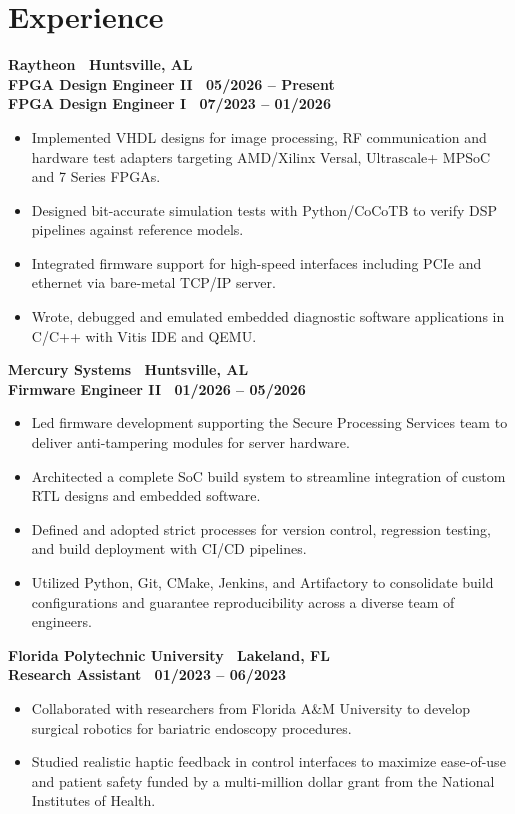 \section{Experience}

\textbf{Raytheon \textbar\ Huntsville, AL} \\
{\small\textbf{FPGA Design Engineer II \textbar\ 05/2026 -- Present}} \\
{\small\textbf{FPGA Design Engineer I \textbar\ 07/2023 -- 01/2026}}

\begin{itemize}
  \item Implemented VHDL designs for image processing, RF communication and hardware test adapters targeting AMD/Xilinx Versal, Ultrascale+ MPSoC and 7 Series FPGAs.
  \item Designed bit-accurate simulation tests with Python/CoCoTB to verify DSP pipelines against reference models.
  \item Integrated firmware support for high-speed interfaces including PCIe and ethernet via bare-metal TCP/IP server.
  \item Wrote, debugged and emulated embedded diagnostic software applications in C/C++ with Vitis IDE and QEMU.
\end{itemize}

\textbf{Mercury Systems \textbar\ Huntsville, AL} \\
{\small\textbf{Firmware Engineer II \textbar\ 01/2026 -- 05/2026}}

\begin{itemize}
  \item Led firmware development supporting the Secure Processing Services team to deliver anti-tampering modules for server hardware.
  \item Architected a complete SoC build system to streamline integration of custom RTL designs and embedded software.
  \item Defined and adopted strict processes for version control, regression testing, and build deployment with CI/CD pipelines.
  \item Utilized Python, Git, CMake, Jenkins, and Artifactory to consolidate build configurations and guarantee reproducibility across a diverse team of engineers.
\end{itemize}

\textbf{Florida Polytechnic University \textbar\ Lakeland, FL} \\
{\small\textbf{Research Assistant \textbar\ 01/2023 -- 06/2023}}

\begin{itemize}
  \item Collaborated with researchers from Florida A\&M University to develop surgical robotics for bariatric endoscopy procedures.
  \item Studied realistic haptic feedback in control interfaces to maximize ease-of-use and patient safety funded by a multi-million dollar grant from the National Institutes of Health.
\end{itemize}
